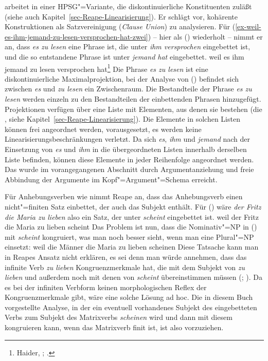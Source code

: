 {\mbox{}\citet{Reape94a} arbeitet in einer HPSG"=Variante, die diskontinuierliche
Konstituenten zuläßt (siehe auch Kapitel~\ref{sec-Reape-Linearisierung}). 
Er schlägt vor, kohärente Konstruktionen
als Satzvereinigung (\emph{Clause Union}) zu analysieren.
Für (\ref{ex-weil-es-ihm-jemand-zu-lesen-versprochen-hat-zwei}) -- hier als ()
wiederholt -- nimmt er an, dass \emph{es zu lesen} eine Phrase ist, die unter
\emph{ihm versprochen} eingebettet ist, und die so entstandene Phrase ist unter \emph{jemand hat}
eingebettet.
\ea
\label{ex-weil-es-ihm-jemand-zu-lesen-versprochen-hat-drei}
weil    es       ihm       jemand   zu lesen versprochen hat\footnote{
Haider, \citeyear[]{Haider86c}; \citeyear[]{Haider90b}.%
}
\z
Die Phrase \emph{es zu lesen} ist eine diskontinuierliche Maximalprojektion, \dash
bei der Analyse von () befindet sich zwischen \emph{es} und \emph{zu lesen} 
ein Zwischenraum. Die Bestandteile der Phrase \emph{es zu lesen} werden einzeln
zu den Bestandteilen der einbettenden Phrasen hinzugefügt. Projektionen verfügen
über eine Liste mit Elementen, aus denen sie bestehen (die \doml, siehe
Kapitel~\ref{sec-Reape-Linearisierung}). Die Elemente in solchen Listen 
können frei angeordnet werden, vorausgesetzt, es werden keine Linearisierungsbeschränkungen
verletzt. Da sich \emph{es}, \emph{ihm} und \emph{jemand} nach der Einsetzung von \emph{es}
und \emph{ihm} in die übergeordneten Listen innerhalb derselben Liste befinden, können
diese Elemente in jeder Reihenfolge angeordnet werden. Das wurde im vorangegangenen
Abschnitt durch Argumentanziehung und freie Abbindung der Argumente im Kopf"=Argument"=Schema
erreicht.

Für Anhebungsverben wie  nimmt Reape an, dass das Anhebungsverb einen nicht"=finiten
Satz einbettet, der auch das Subjekt enthält. Für () wäre
\emph{der Fritz die Maria zu lieben} also ein Satz, der unter  \emph{scheint} eingebettet ist.
\ea
weil    der Fritz die Maria zu lieben scheint
\z
Das Problem ist nun, dass die Nominativ"=NP in () mit \emph{scheint} kongruiert, was man noch besser
sieht, wenn man eine Plural"=NP einsetzt:
\ea
weil    die Männer die Maria zu lieben scheinen
\z
Diese Tatsache kann man in Reapes Ansatz nicht erklären, es sei denn man würde
annehmen, dass das infinite Verb \emph{zu lieben} Kongruenzmerkmale hat, die mit dem
Subjekt von \emph{zu lieben} und außerdem noch mit denen von \emph{scheint} übereinstimmen
müssen (; ). 
Da es bei der infiniten Verbform keinen morphologischen Reflex der Kongruenzmerkmale
gibt, wäre eine solche Lösung ad hoc. Die in diesem Buch vorgestellte Analyse, in der
ein eventuell vorhandenes Subjekt des eingebetteten Verbs zum Subjekt des Matrixverbs \emph{scheinen}
wird und dann mit diesem kongruieren kann, wenn das Matrixverb finit ist, ist also vorzuziehen.

}
